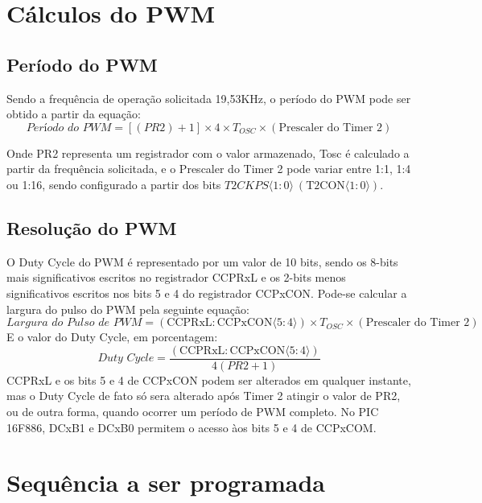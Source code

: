 \documentclass{article}
\begin{document}
\section{Cálculos do PWM}

\subsection{Período do PWM}
Sendo a frequência de operação solicitada 19,53KHz, o período do PWM pode ser obtido a partir da equação:
\begin{equation}
\textit{Período do PWM} = \left[(PR2) + 1\right] \times 4 \times T_{OSC} \times (\text{Prescaler do Timer 2})
\end{equation}

Onde PR2 representa um registrador com o valor armazenado, Tosc é calculado a partir da frequência solicitada, e o Prescaler do Timer 2 pode variar entre 1:1, 1:4 ou 1:16, sendo configurado a partir dos bits $T2CKPS\langle 1{:}0 \rangle\ (\text{T2CON}\langle 1{:}0 \rangle).$

\subsection{Resolução do PWM}
O Duty Cycle do PWM é representado por um valor de 10 bits, sendo os 8-bits mais
significativos escritos no registrador CCPRxL e os 2-bits menos significativos escritos nos bits 5 e 4 do registrador CCPxCON. Pode-se calcular a largura do pulso do PWM pela seguinte equação:
\begin{equation}
    \textit{Largura do Pulso de PWM} = (\text{CCPRxL} : \text{CCPxCON}\langle 5{:}4 \rangle) \times T_{OSC} \times (\text{Prescaler do Timer 2})
\end{equation}
E o valor do Duty Cycle, em porcentagem:
\begin{equation}
\textit{Duty Cycle} = \frac{(\text{CCPRxL} : \text{CCPxCON}\langle 5{:}4 \rangle)}{4 (PR2 + 1)}
\end{equation}
CCPRxL e os bits 5 e 4 de CCPxCON podem ser alterados em qualquer instante, mas o Duty Cycle de fato só sera alterado após Timer 2 atingir o valor de PR2, ou de outra forma, quando ocorrer um período de PWM completo.
No PIC 16F886, DCxB1 e DCxB0 permitem o acesso àos bits 5 e 4 de CCPxCOM.
\section{Sequência a ser programada}
\end{document}
